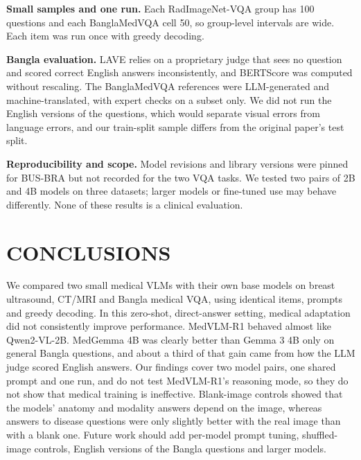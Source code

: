 \documentclass[doublecolumn]{ijcvsplatex}
\newcommand{\medvlm}{MedVLM-R1}
\newcommand{\medgemma}{MedGemma}
\begin{document}
\textbf{Small samples and one run.} Each RadImageNet-VQA group has 100 questions and each BanglaMedVQA cell 50, so group-level intervals are wide. Each item was run once with greedy decoding.


\textbf{Bangla evaluation.} LAVE relies on a proprietary judge that sees no question and scored correct English answers inconsistently, and BERTScore was computed without rescaling. The BanglaMedVQA references were LLM-generated and machine-translated, with expert checks on a subset only. We did not run the English versions of the questions, which would separate visual errors from language errors, and our train-split sample differs from the original paper's test split.


\textbf{Reproducibility and scope.} Model revisions and library versions were pinned for BUS-BRA but not recorded for the two VQA tasks. We tested two pairs of 2B and 4B models on three datasets; larger models or fine-tuned use may behave differently. None of these results is a clinical evaluation.

\section{CONCLUSIONS}
\label{sec_conclusion}
We compared two small medical VLMs with their own base models on breast ultrasound, CT/MRI and Bangla medical VQA, using identical items, prompts and greedy decoding. In this zero-shot, direct-answer setting, medical adaptation did not consistently improve performance. MedVLM-R1 behaved almost like Qwen2-VL-2B. MedGemma 4B was clearly better than Gemma 3 4B only on general Bangla questions, and about a third of that gain came from how the LLM judge scored English answers. Our findings cover two model pairs, one shared prompt and one run, and do not test MedVLM-R1’s reasoning mode, so they do not show that medical training is ineffective. {\color{blue}Blank-image controls showed that the models' anatomy and modality answers depend on the image, whereas answers to disease questions were only slightly better with the real image than with a blank one. Future work should add per-model prompt tuning, shuffled-image controls, English versions of the Bangla questions and larger models.}







\end{document}
